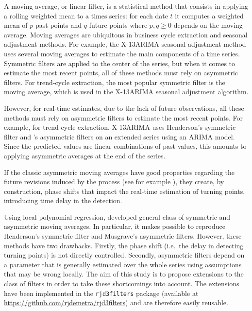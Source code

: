 \documentclass[
]{article}
\newcommand\1{\mathds{1}}
\begin{document}
A moving average, or linear filter, is a statistical method that
consists in applying a rolling weighted mean to a times series: for each
date \(t\) it computes a weighted mean of \(p\) past points and \(q\)
future points where \(p,q\geq0\) depends on the moving average. Moving
averages are ubiquitous in business cycle extraction and seasonal
adjustment methods. For example, the X-13ARIMA seasonal adjustment
method uses several moving averages to estimate the main components of a
time series. Symmetric filters are applied to the center of the series,
but when it comes to estimate the most recent points, all of these
methods must rely on asymmetric filters. For trend-cycle extraction, the
most popular symmetric filter is the \textcite{henderson1916note} moving
average, which is used in the X-13ARIMA seasonal adjustment algorithm.

However, for real-time estimates, due to the lack of future
observations, all these methods must rely on asymmetric filters to
estimate the most recent points. For example, for trend-cycle
extraction, X-13ARIMA uses Henderson's symmetric filter and
\textcite{musgrave1964set}'s asymmetric filters on an extended series
using an ARIMA model. Since the predicted values are linear combinations
of past values, this amounts to applying asymmetric averages at the end
of the series.

If the classic asymmetric moving averages have good properties regarding
the future revisions induced by the process (see for example
\textcite{pierce1980SA}), they create, by construction, phase shifts
that impact the real-time estimation of turning points, introducing time
delay in the detection.

Using local polynomial regression, \textcite{proietti2008} developed
general class of symmetric and asymmetric moving averages. In
particular, it makes possible to reproduce Henderson's symmetric filter
and Musgrave's asymmetric filters. However, these methods have two
drawbacks. Firstly, the phase shift (i.e.~the delay in detecting turning
points) is not directly controlled. Secondly, asymmetric filters depend
on a parameter that is generally estimated over the whole series using
assumptions that may be wrong locally. The aim of this study is to
propose extensions to the \textcite{proietti2008} class of filters in
order to take these shortcomings into account. The extensions have been
implemented in the  \texttt{rjd3filters} package
(available at \url{https://github.com/rjdemetra/rjd3filters}) and are
therefore easily reusable.
\end{document}
